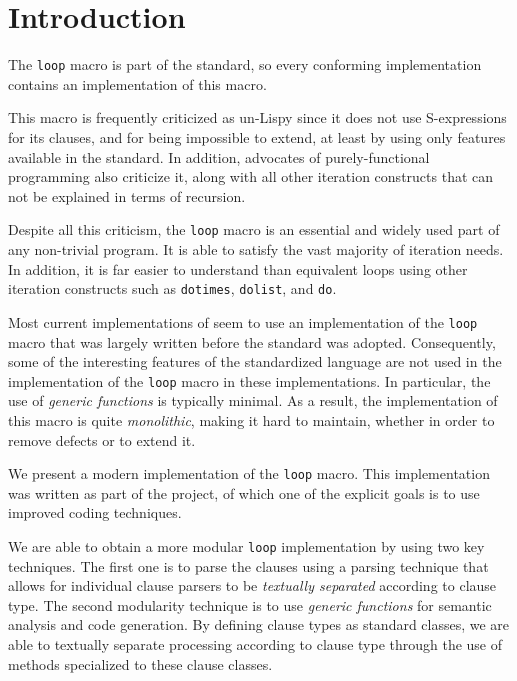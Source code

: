 \section{Introduction}
\label{sec-introduction}

The \texttt{loop} macro is part of the \commonlisp{} standard, so
every conforming \commonlisp{} implementation contains an
implementation of this macro. 

This macro is frequently criticized as un-Lispy since it does not use
S-expressions for its clauses, and for being impossible to extend, at
least by using only features available in the \commonlisp{} standard.
In addition, advocates of purely-functional programming also criticize
it, along with all other iteration constructs that can not be
explained in terms of recursion.

Despite all this criticism, the \texttt{loop} macro is an essential
and widely used part of any non-trivial \commonlisp{} program.  It is
able to satisfy the vast majority of iteration needs.  In addition, it
is far easier to understand than equivalent loops using other
iteration constructs such as \texttt{dotimes}, \texttt{dolist}, and
\texttt{do}.

Most current implementations of \commonlisp{} seem to use an
implementation of the \texttt{loop} macro that was largely written
before the \commonlisp{} standard was adopted.  Consequently, some of
the interesting features of the standardized \commonlisp{} language
are not used in the implementation of the \texttt{loop} macro in
these implementations.  In particular, the use of \emph{generic
  functions} is typically minimal.  As a result, the implementation of
this macro is quite \emph{monolithic}, making it hard to maintain,
whether in order to remove defects or to extend it.

We present a modern implementation of the \texttt{loop} macro.  This
implementation was written as part of the \sicl{} project, of
which one of the explicit goals is to use improved coding techniques.

We are able to obtain a more modular \texttt{loop} implementation by
using two key techniques.  The first one is to parse the clauses using
a parsing technique that allows for individual clause parsers to be
\emph{textually separated} according to clause type.  The second
modularity technique is to use \emph{generic functions} for semantic
analysis and code generation.  By defining clause types as standard
classes, we are able to textually separate processing according to
clause type through the use of methods specialized to these clause
classes.
